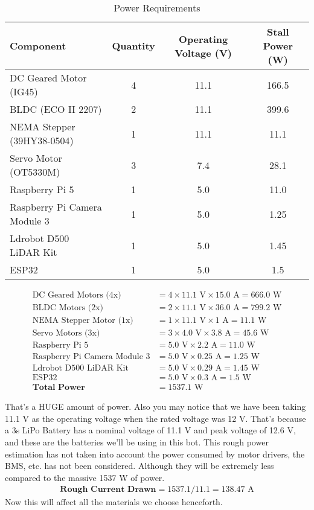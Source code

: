 \documentclass[12pt]{article}
\begin{document}
\begin{table}[h]
\centering
\begin{tabular}{|l|c|c|c|}
\hline
\textbf{Component} & \textbf{Quantity} & \textbf{Operating Voltage (V)} & \textbf{Stall Power (W)} \\
\hline
DC Geared Motor (IG45) & 4 & 11.1 & 166.5 \\
\hline
BLDC (ECO II 2207) & 2 & 11.1 & 399.6 \\
\hline
NEMA Stepper (39HY38-0504) & 1 & 11.1 & 11.1 \\
\hline
Servo Motor (OT5330M) & 3 & 7.4 & 28.1 \\
\hline
Raspberry Pi 5 & 1 & 5.0 & 11.0 \\
\hline
Raspberry Pi Camera Module 3 & 1 & 5.0 & 1.25 \\
\hline
Ldrobot D500 LiDAR Kit & 1 & 5.0 & 1.45 \\
\hline
ESP32 & 1 & 5.0 & 1.5 \\
\hline
\end{tabular}
\caption{Power Requirements}
\end{table}

\begin{align*}
\text{DC Geared Motors (4x)} &= 4 \times 11.1\text{ V} \times 15.0\text{ A} = 666.0\text{ W} \\
\text{BLDC Motors (2x)} &= 2 \times 11.1\text{ V} \times 36.0\text{ A} = 799.2\text{ W} \\
\text{NEMA Stepper Motor (1x)} &= 1 \times 11.1\text{ V} \times 1\text{ A} = 11.1\text{ W} \\
\text{Servo Motors (3x)} &= 3 \times 4.0\text{ V} \times 3.8\text{ A} = 45.6\text{ W} \\
\text{Raspberry Pi 5} &= 5.0\text{ V} \times 2.2\text{ A} = 11.0\text{ W} \\
\text{Raspberry Pi Camera Module 3} &= 5.0\text{ V} \times 0.25\text{ A} = 1.25\text{ W} \\
\text{Ldrobot D500 LiDAR Kit} &= 5.0\text{ V} \times 0.29\text{ A} = 1.45\text{ W} \\
\text{ESP32} &= 5.0\text{ V} \times 0.3\text{ A} = 1.5\text{ W} \\
\textbf{Total Power} &= 1537.1\text{ W}
\end{align*}

That's a HUGE amount of power. Also you may notice that we have been taking 11.1 V as the operating voltage when the rated voltage was 12 V. That's because a 3s LiPo Battery has a nominal voltage of 11.1 V and peak voltage of 12.6 V, and these are the batteries we'll be using in this bot.
\newline
This rough power estimation has not taken into account the power consumed by motor drivers, the BMS, etc. has not been considered. Although they will be extremely less compared to the massive 1537 W of power.
\begin{align*}
    \textbf{Rough Current Drawn} = 1537.1/11.1 = 138.47\text{ A}
\end{align*}
Now this will affect all the materials we choose henceforth.
\end{document}
